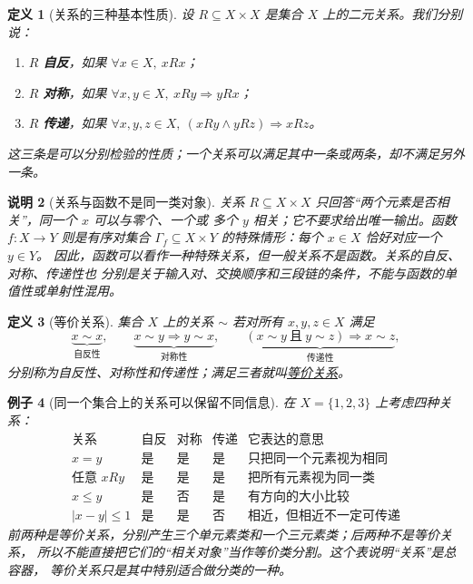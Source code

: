 \documentclass[UTF8,fontset=none,a4paper,11pt]{ctexart}
\theoremstyle{foundation-definition}
\newtheorem{definition}{定义}[section]
\theoremstyle{foundation-theorem}
\theoremstyle{foundation-proposition}
\theoremstyle{foundation-example}
\newtheorem{example}[definition]{例子}
\theoremstyle{foundation-remark}
\newtheorem{remark}[definition]{说明}
\theoremstyle{foundation-theorem}
\newcommand{\term}[2]{\hyperref[#1]{#2}}
\begin{document}
\begin{definition}[关系的三种基本性质]\label{def:relation-properties}
设 \(R\subseteq X\times X\) 是集合 \(X\) 上的二元关系。我们分别说：
\begin{enumerate}[label=(\alph*)]
  \item \(R\) \textbf{自反}，如果 \(\forall x\in X,\ xRx\)；
  \item \(R\) \textbf{对称}，如果 \(\forall x,y\in X,\ xRy\Rightarrow yRx\)；
  \item \(R\) \textbf{传递}，如果 \(\forall x,y,z\in X,\ (xRy\land yRz)\Rightarrow xRz\)。
\end{enumerate}
这三条是可以分别检验的性质；一个关系可以满足其中一条或两条，却不满足另外一条。
\end{definition}

\begin{remark}[关系与函数不是同一类对象]
关系 \(R\subseteq X\times X\) 只回答“两个元素是否相关”，同一个 \(x\) 可以与零个、一个或
多个 \(y\) 相关；它不要求给出唯一输出。函数 \(f:X\to Y\) 则是有序对集合
\(\Gamma_f\subseteq X\times Y\) 的特殊情形：每个 \(x\in X\) 恰好对应一个 \(y\in Y\)。
因此，函数可以看作一种特殊关系，但一般关系不是函数。关系的自反、对称、传递性也
分别是关于输入对、交换顺序和三段链的条件，不能与函数的单值性或单射性混用。
\end{remark}

\begin{definition}[等价关系]\label{def:equivalence}
集合 \(X\) 上的关系 \(\sim\) 若对所有 \(x,y,z\in X\) 满足
\[
\underbrace{x\sim x}_{\text{自反性}},\qquad
\underbrace{x\sim y\Rightarrow y\sim x}_{\text{对称性}},\qquad
\underbrace{(x\sim y\ \text{且}\ y\sim z)\Rightarrow x\sim z}_{\text{传递性}},
\]
分别称为自反性、对称性和传递性；满足三者就叫\term{def:equivalence}{等价关系}。
\end{definition}

\begin{example}[同一个集合上的关系可以保留不同信息]
在 \(X=\{1,2,3\}\) 上考虑四种关系：
\[
\begin{array}{c|c|c|c|c}
\text{关系}&\text{自反}&\text{对称}&\text{传递}&\text{它表达的意思}\\
\hline
x=y&\text{是}&\text{是}&\text{是}&\text{只把同一个元素视为相同}\\
\text{任意 }xRy&\text{是}&\text{是}&\text{是}&\text{把所有元素视为同一类}\\
x\le y&\text{是}&\text{否}&\text{是}&\text{有方向的大小比较}\\
|x-y|\le1&\text{是}&\text{是}&\text{否}&\text{相近，但相近不一定可传递}
\end{array}
\]
前两种是等价关系，分别产生三个单元素类和一个三元素类；后两种不是等价关系，
所以不能直接把它们的“相关对象”当作等价类分割。这个表说明“关系”是总容器，
等价关系只是其中特别适合做分类的一种。
\end{example}
\end{document}

